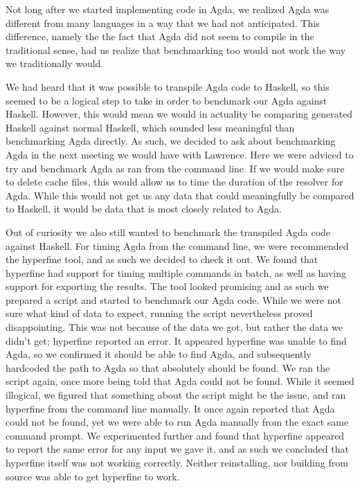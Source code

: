 \documentclass[a4paper,UKenglish,cleveref, autoref, thm-restate]{template/lipics-v2021}
\begin{document}
Not long after we started implementing code in Agda, we realized Agda was different from many languages in a way that we had not anticipated. This difference, namely the the fact that Agda did not seem to compile in the traditional sense, had us realize that benchmarking too would not work the way we traditionally would.

We had heard that it was possible to transpile Agda code to Haskell, so this seemed to be a logical step to take in order to benchmark our Agda against Haskell. However, this would mean we would in actuality be comparing generated Haskell against normal Haskell, which sounded less meaningful than benchmarking Agda directly. As such, we decided to ask about benchmarking Agda in the next meeting we would have with Lawrence.\newline 
Here we were adviced to try and benchmark Agda as ran from the command line. If we would make sure to delete cache files, this would allow us to time the duration of the resolver for Agda. While this would not get us any data that could meaningfully be compared to Haskell, it would be data that is most closely related to Agda.

Out of curiosity we also still wanted to benchmark the transpiled Agda code against Haskell. For timing Agda from the command line, we were recommended the hyperfine \cite{hyperfine} tool, and as such we decided to check it out. We found that hyperfine had support for timing multiple commands in batch, as well as having support for exporting the results. The tool looked promising and as such we prepared a script and started to benchmark our Agda code.\newline
While we were not sure what kind of data to expect, running the script nevertheless proved disappointing. This was not because of the data we got, but rather the data we didn't get; hyperfine reported an error. It appeared hyperfine was unable to find Agda, so we confirmed it should be able to find Agda, and subsequently hardcoded the path to Agda so that absolutely should be found. We ran the script again, once more being told that Agda could not be found.\newline
While it seemed illogical, we figured that something about the script might be the issue, and ran hyperfine from the command line manually. It once again reported that Agda could not be found, yet we were able to run Agda manually from the exact same command prompt. We experimented further and found that hyperfine appeared to report the same error for any input we gave it, and as such we concluded that hyperfine itself was not working correctly. Neither reinstalling, nor building from source was able to get hyperfine to work.
 
\end{document}
